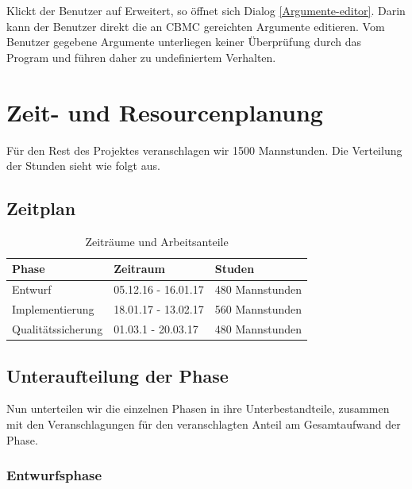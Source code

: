 \documentclass[a4paper]{scrreprt}
\begin{document}
Klickt der \gls{Benutzer} auf Erweitert, so öffnet sich Dialog \ref{Argumente-editor}. Darin kann der \gls{Benutzer} direkt die an \ac{CBMC} gereichten Argumente editieren. Vom \gls{Benutzer} gegebene Argumente unterliegen keiner Überprüfung durch das Program und führen daher zu undefiniertem Verhalten. 

\chapter{Zeit- und Resourcenplanung}

Für den Rest des Projektes veranschlagen wir 1500 Mannstunden. Die Verteilung
der Stunden sieht wie folgt aus.

\section{Zeitplan}

\begin{table}[H]
\centering
  \begin{tabular}{|p{3cm}|P{2cm}|P{2cm}|}
    Phase & Zeitraum & Studen \\ \hline
    Entwurf & 05.12.16 - 16.01.17 & 480 Mannstunden \\ \hline
    Implementierung & 18.01.17 - 13.02.17 & 560 Mannstunden \\ \hline
    Qualitätssicherung & 01.03.1 - 20.03.17 & 480 Mannstunden \\
  \end{tabular}
  \newline\newline
  \caption{Zeiträume und Arbeitsanteile}\label{tab1}
\end{table}


\section{Unteraufteilung der Phase}
Nun unterteilen wir die einzelnen Phasen in ihre Unterbestandteile,
zusammen mit den Veranschlagungen für den veranschlagten Anteil am Gesamtaufwand
der Phase.

\subsection{Entwurfsphase}
\end{document}
